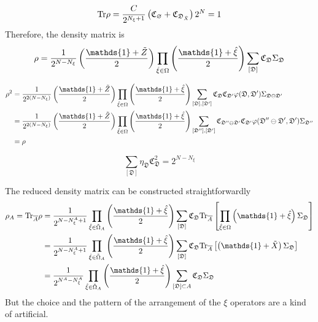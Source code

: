 \[
    \mathrm{Tr}\rho
    =
    \frac{C}{2^{N_\xi + 1}}
    \left( \mathfrak{C}_\varnothing + \mathfrak{C}_{\mathfrak{D}_{\tilde{X}}} \right)
    2^{N}
    =
    1
\]
Therefore, the density matrix is
\begin{equation}
    \rho
    =
    \frac{1}{2^{N - N_\xi}}
    \lr{\frac{\mathds{1} + \tilde{Z}}{2}}
    \prod_{\hat{\xi}\in\Omega}
    \lr{\frac{\mathds{1} + \hat{\xi}}{2}}
    \sum_{[\mathfrak{D}]}
    \mathfrak{C}_\mathfrak{D}
    \Sigma_\mathfrak{D}
\end{equation}

\begin{align*}
    \rho^2
    &=
    \frac{1}{2^{2(N - N_\xi)}}
    \lr{\frac{\mathds{1} + \tilde{Z}}{2}}
    \prod_{\hat{\xi} \in \Omega}
    \lr{\frac{\mathds{1} + \hat{\xi}}{2}}
    \sum_{[\mathfrak{D}], [\mathfrak{D}']}
    \mathfrak{C}_{\mathfrak{D}}
    \mathfrak{C}_{\mathfrak{D}'}
    \varphi(\mathfrak{D},\mathfrak{D}')
    \Sigma_{\mathfrak{D}\ominus\mathfrak{D}'} \\
    &=
    \frac{1}{2^{2(N - N_\xi)}}
    \lr{\frac{\mathds{1} + \tilde{Z}}{2}}
    \prod_{\hat{\xi} \in \Omega}
    \lr{\frac{\mathds{1} + \hat{\xi}}{2}}
    \sum_{
    [\mathfrak{D}''], [\mathfrak{D}']
    }
    \mathfrak{C}_{\mathfrak{D}''\ominus\mathfrak{D}'}
    \mathfrak{C}_{\mathfrak{D}'}
    \varphi(\mathfrak{D}''\ominus\mathfrak{D}',\mathfrak{D}')
    \Sigma_{\mathfrak{D}''} \\
    &=\rho
\end{align*}

\[
\sum_{[\mathfrak{D}]} \eta_\mathfrak{D}\mathfrak{C}_{\mathfrak{D}}^2
=
2^{N - N_\xi}
\]


The reduced density matrix can be constructed straightforwardly
\begin{align*}
    \rho_A
    =
    \Tr_{\overline{A}}\rho
    &=
    \frac{1}{2^{N - N^A_\xi + 1}}
    \prod_{\hat{\xi} \in \tilde{\Omega}_A}\lr{\frac{\mathds{1} + \hat{\xi}}{2}}
    \sum_{[\mathfrak{D}]}
    \mathfrak{C}_\mathfrak{D} 
    \Tr_{\overline{A}}
    \lrm{
        \prod_{\hat{\xi} \in \Omega}
        \lr{\mathds{1} + \hat{\xi}}
        \Sigma_\mathfrak{D} 
    }
    \\
    &=
    \frac{1}{2^{N - N^A_\xi + 1}}
    \prod_{\hat{\xi} \in \tilde{\Omega}_A}\lr{\frac{\mathds{1} + \hat{\xi}}{2}}
    \sum_{[\mathfrak{D}]}
    \mathfrak{C}_\mathfrak{D} 
    \Tr_{\overline{A}}
    \lrm{
        \lr{
            \mathds{1} + \tilde{X}
        }
        \Sigma_\mathfrak{D} 
    } 
    \\
    &=
    \frac{1}{2^{N^A - N^A_\xi}}
    \prod_{\hat{\xi} \in \tilde{\Omega}_A}
    \lr{\frac{\mathds{1} + \hat{\xi}}{2}}
    \sum_{[\mathfrak{D}]\subset A} \mathfrak{C}_\mathfrak{D} \Sigma_\mathfrak{D}
\end{align*}
\alert{But the choice and the pattern of the arrangement of the $\xi$ operators are a kind of artificial.}

